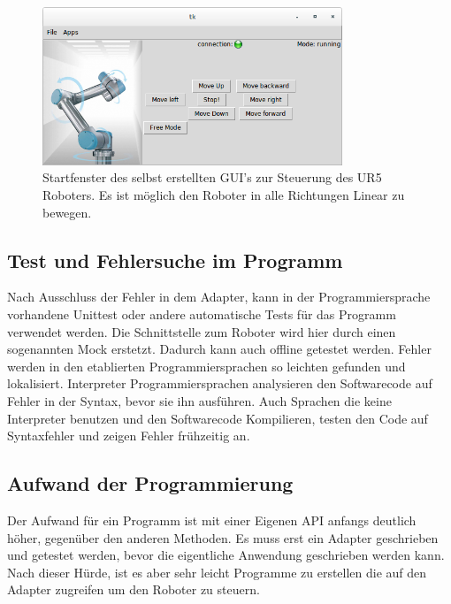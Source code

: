 \begin{figure}[H]
  \centering
    \includegraphics[width=0.8\textwidth]{pic/hda_urcontrol_gui.png}
      \caption[Selbsterstelltes GUI zur Steuerung des UR5 Roboters]{Startfenster des selbst erstellten GUI's zur Steuerung des UR5 Roboters. Es ist möglich den Roboter in alle Richtungen Linear zu bewegen.}
      \label{fig:hda_urcontrol_gui}
\end{figure}

\subsection{Test und Fehlersuche im Programm}
\label{debuggen_mit_hoeherer schicht}

Nach Ausschluss der Fehler in dem Adapter, kann in der Programmiersprache vorhandene \ac{Unittest} oder andere automatische Tests für das Programm verwendet werden. Die Schnittstelle zum Roboter wird hier durch einen sogenannten \ac{Mock} erstetzt. Dadurch kann auch offline getestet werden. Fehler werden in den etablierten Programmiersprachen so leichten gefunden und lokalisiert. \ac{Interpreter} Programmiersprachen analysieren den Softwarecode auf Fehler in der Syntax, bevor sie ihn ausführen. Auch Sprachen die keine \ac{Interpreter} benutzen und den Softwarecode Kompilieren, testen den Code auf Syntaxfehler und zeigen Fehler frühzeitig an.

\subsection{Aufwand der Programmierung}
\label{eigene_api_aufwand}

Der Aufwand für ein Programm ist mit einer Eigenen API anfangs deutlich höher, gegenüber den anderen Methoden. Es muss erst ein Adapter geschrieben und getestet werden, bevor die eigentliche Anwendung geschrieben werden kann. 
Nach dieser Hürde, ist es aber sehr leicht Programme zu erstellen die auf den Adapter zugreifen um den Roboter zu steuern.